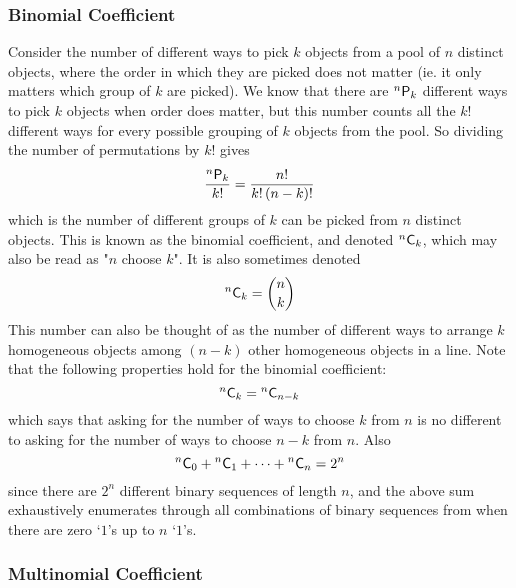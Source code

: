 \documentclass[11pt]{report} %
\begin{document}
\subsubsection{Binomial Coefficient}

Consider the number of different ways to pick $k$ objects from a pool of $n$ distinct objects, where the order in which they are picked does not matter (ie. it only matters which group of $k$ are picked). We know that there are $\mathstrut^{n}\mathsf{P}_{k}$ different ways to pick $k$ objects when order does matter, but this number counts all the $k!$ different ways for every possible grouping of $k$ objects from the pool. So dividing the number of permutations by $k!$ gives
\begin{equation}
\dfrac{\mathstrut^{n}\mathsf{P}_{k}}{k!} = \dfrac{n!}{k!\left(n - k\right)!}
\end{equation}
which is the number of different groups of $k$ can be picked from $n$ distinct objects. This is known as the binomial coefficient, and denoted $\mathstrut^{n}\mathsf{C}_{k}$, which may also be read as "$n$ choose $k$". It is also sometimes denoted
\begin{equation}
\mathstrut^{n}\mathsf{C}_{k} = \binom{n}{k}
\end{equation}
This number can also be thought of as the number of different ways to arrange $k$ homogeneous objects among $\left(n - k\right)$ other homogeneous objects in a line. Note that the following properties hold for the binomial coefficient:
\begin{equation}
\mathstrut^{n}\mathsf{C}_{k} = \mathstrut^{n}\mathsf{C}_{n - k}
\end{equation}
which says that asking for the number of ways to choose $k$ from $n$ is no different to asking for the number of ways to choose $n - k$ from $n$. Also
\begin{equation}
\mathstrut^{n}\mathsf{C}_{0} + \mathstrut^{n}\mathsf{C}_{1} + \dots + \mathstrut^{n}\mathsf{C}_{n} = 2^{n}
\end{equation}
since there are $2^{n}$ different binary sequences of length $n$, and the above sum exhaustively enumerates through all combinations of binary sequences from when there are zero `$1$'s up to $n$ `$1$'s.

\subsubsection{Multinomial Coefficient}
\end{document}
